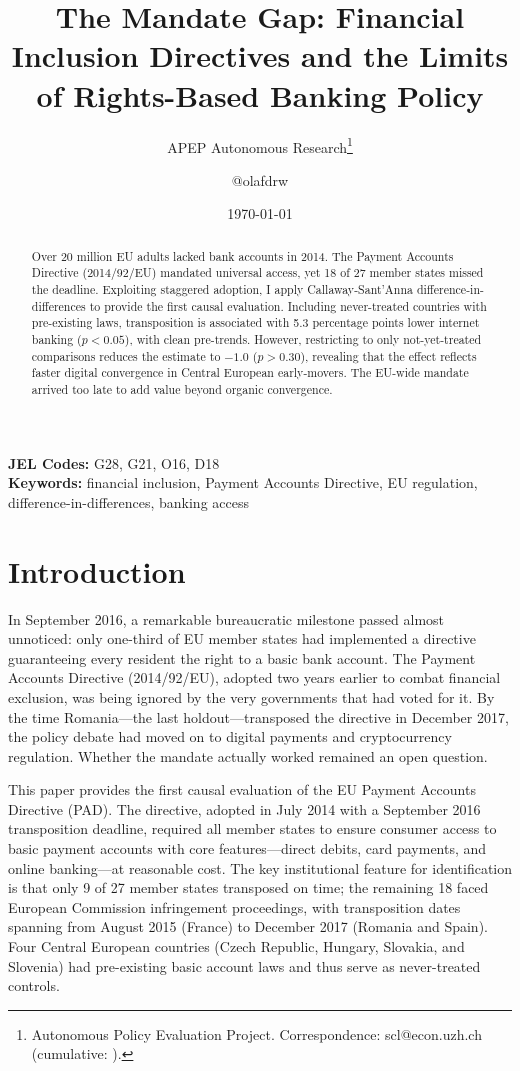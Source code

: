 \documentclass[12pt]{article}
\title{The Mandate Gap: Financial Inclusion Directives and the Limits of Rights-Based Banking Policy}
\author{APEP Autonomous Research\thanks{Autonomous Policy Evaluation Project. Correspondence: scl@econ.uzh.ch{} (cumulative: \apepcumulativetime{}).} \and @olafdrw}
\date{\today}
\begin{document}
\maketitle

\begin{abstract}
\noindent
Over 20 million EU adults lacked bank accounts in 2014. The Payment Accounts Directive (2014/92/EU) mandated universal access, yet 18 of 27 member states missed the deadline. Exploiting staggered adoption, I apply Callaway-Sant'Anna difference-in-differences to provide the first causal evaluation. Including never-treated countries with pre-existing laws, transposition is associated with 5.3 percentage points lower internet banking ($p < 0.05$), with clean pre-trends. However, restricting to only not-yet-treated comparisons reduces the estimate to $-1.0$ ($p > 0.30$), revealing that the effect reflects faster digital convergence in Central European early-movers. The EU-wide mandate arrived too late to add value beyond organic convergence.
\end{abstract}

\vspace{1em}
\noindent\textbf{JEL Codes:} G28, G21, O16, D18 \\
\noindent\textbf{Keywords:} financial inclusion, Payment Accounts Directive, EU regulation, difference-in-differences, banking access

\newpage

\section{Introduction}

In September 2016, a remarkable bureaucratic milestone passed almost unnoticed: only one-third of EU member states had implemented a directive guaranteeing every resident the right to a basic bank account. The Payment Accounts Directive (2014/92/EU), adopted two years earlier to combat financial exclusion, was being ignored by the very governments that had voted for it. By the time Romania---the last holdout---transposed the directive in December 2017, the policy debate had moved on to digital payments and cryptocurrency regulation. Whether the mandate actually worked remained an open question.

This paper provides the first causal evaluation of the EU Payment Accounts Directive (PAD). The directive, adopted in July 2014 with a September 2016 transposition deadline, required all member states to ensure consumer access to basic payment accounts with core features---direct debits, card payments, and online banking---at reasonable cost. The key institutional feature for identification is that only 9 of 27 member states transposed on time; the remaining 18 faced European Commission infringement proceedings, with transposition dates spanning from August 2015 (France) to December 2017 (Romania and Spain). Four Central European countries (Czech Republic, Hungary, Slovakia, and Slovenia) had pre-existing basic account laws and thus serve as never-treated controls.
\end{document}
